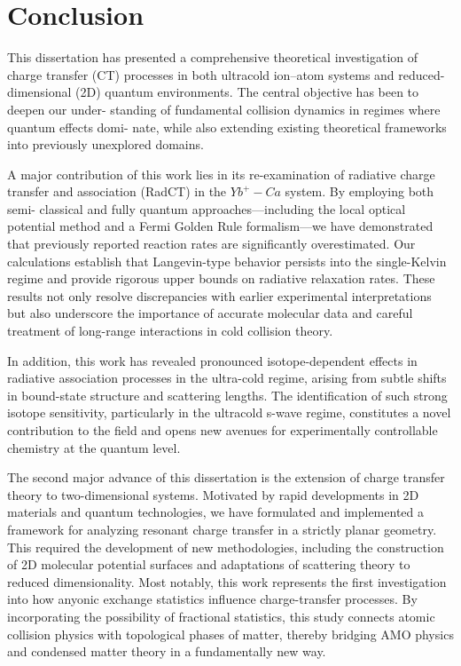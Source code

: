 \chapter{Conclusion}
\label{conclusion}

This dissertation has presented a comprehensive theoretical investigation of charge transfer (CT) processes in both ultracold ion–atom systems and reduced-dimensional (2D) quantum environments. The central objective has been to deepen our under- standing of fundamental collision dynamics in regimes where quantum effects domi- nate, while also extending existing theoretical frameworks into previously unexplored domains.


A major contribution of this work lies in its re-examination of radiative charge transfer and association (RadCT) in the 
$ Yb^+ - Ca $ system. By employing both semi- classical and fully quantum approaches—including the local optical potential method and a Fermi Golden Rule formalism—we have demonstrated that previously reported reaction rates are significantly overestimated. Our calculations establish that Langevin-type behavior persists into the single-Kelvin regime and provide rigorous upper bounds on radiative relaxation rates. These results not only resolve discrepancies with earlier experimental interpretations but also underscore the importance of accurate molecular data and careful treatment of long-range interactions in cold collision theory.


In addition, this work has revealed pronounced isotope-dependent effects in radiative association processes in the ultra-cold regime, arising from subtle shifts in bound-state structure and scattering lengths. The identification of such strong isotope sensitivity, particularly in the ultracold s-wave regime, constitutes a novel contribution to the field and opens new avenues for experimentally controllable chemistry at the quantum level.


The second major advance of this dissertation is the extension of charge transfer theory to two-dimensional systems. Motivated by rapid developments in 2D materials and quantum technologies, we have formulated and implemented a framework for analyzing resonant charge transfer in a strictly planar geometry. This required the development of new methodologies, including the construction of 2D molecular potential surfaces and adaptations of scattering theory to reduced dimensionality.  Most notably, this work represents the first investigation into how anyonic exchange statistics influence charge-transfer processes. By incorporating the possibility of fractional statistics, this study connects atomic collision physics with topological phases of matter, thereby bridging AMO physics and condensed matter theory in a fundamentally new way.


